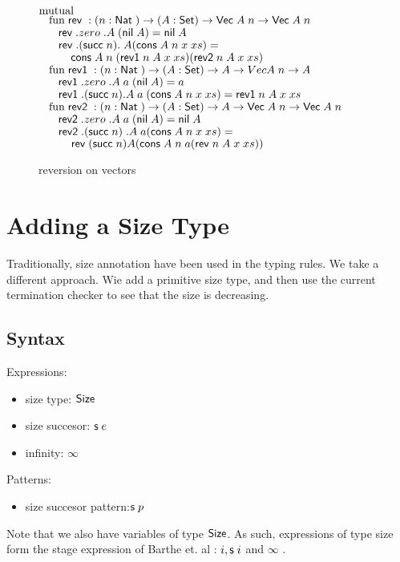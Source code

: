\begin{figure} 
$\mathrm{mutual}\; $ \\
$\hspace*{3mm} \mathrm{fun}\; \mathsf{rev}\; : ( n : \mathsf{Nat}\;  ) \rightarrow{( A : \mathsf{Set}) \rightarrow{\mathsf{Vec}\;A \; n \rightarrow\mathsf{Vec}\;A \; n}}$\\
$\spc \spc \rev .zero \; .A  \; (\nil A) = \nil A $\\
$\spc \spc \rev .(\suc n) .\; A (\cons A \; n \; x \; xs) = $\\
$\spcx \cons A \; n \; (\reva n \; A \; x \; xs) (\revb n \; A \; x \; xs) $ \\
$\hspace*{3mm} \mathrm{fun}\; \mathsf{rev1}\; : ( n : \mathsf{Nat}\; ) \rightarrow( A : \mathsf{Set} ) \rightarrow{A \rightarrow Vec A \; n \rightarrow A}$\\
$\spc \spc \reva .zero  \; .A \; a \; (\nil A) = a $\\
$\spc \spc \reva .(\suc n) .A \; a \; (\cons A \; n \; x \; xs) = \reva n \; A \; x \; xs $\\
$\hspace*{3mm} \mathrm{fun}\; \mathsf{rev2}\; : ( n : \mathsf{Nat}\; ) \rightarrow{( A : \mathsf{Set}) \rightarrow{A \rightarrow\mathsf{Vec}\;A \; n \rightarrow\mathsf{Vec}\;A \; n}}$\\
$ \spc \spc \revb .zero \; .A  \; a \; (\nil A) = \nil A $\\
$ \spc \spc \revb .(\suc n) \; .A \; a (\cons A \; n \; x \; xs) = $\\
$ \spcx \rev (\suc n) A (\cons A \; n \; a (\rev n \; A \; x \; xs))$
\caption{reversion on vectors}  
\end{figure}  

\chapter{Adding a Size Type}
Traditionally, size annotation have been used in the typing rules.
We take a different approach.
Wie add a primitive size type, and then use the current termination checker to see that the size is 
decreasing.
\section{Syntax}

Expressions:
\begin{itemize}
\item
size type: $ \mathsf{Size} $ 
\item
size succesor: $\mathsf{s}\; e $ 
\item
infinity: $\infty$ 
\end{itemize}
Patterns:
\begin{itemize}
\item
size succesor pattern:$ \mathsf{s}\; p $ 
\end{itemize}
Note that we also have variables of type $\mathsf{Size}$.
As such, expressions of type size form the stage expression of Barthe et. al :  $ i , \mathsf{s}\; i $ and $ \infty $ .

